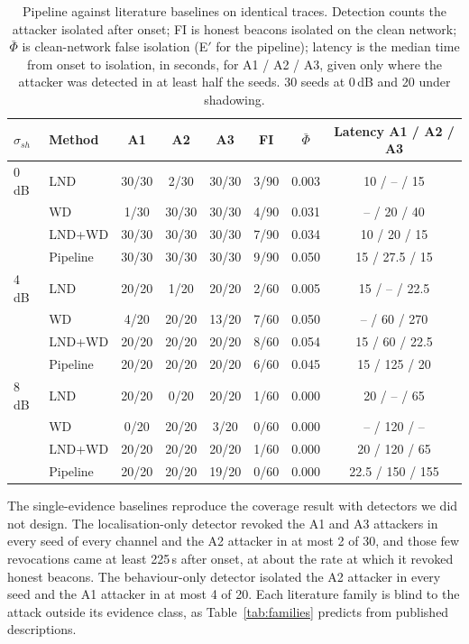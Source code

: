 \begin{table}[!t]
\caption{Pipeline against literature baselines on identical traces. Detection
counts the attacker isolated after onset; FI is honest beacons isolated on the
clean network; $\bar\Phi$ is clean-network false isolation (E$'$ for the
pipeline); latency is the median time from onset to isolation, in seconds,
for A1 / A2 / A3, given only where the attacker was detected in at least half
the seeds. 30 seeds at 0\,dB and 20 under shadowing.}
\label{tab:baselines}
\centering
\footnotesize
\setlength{\tabcolsep}{3.5pt}
\begin{tabular}{@{}llcccccc@{}}
\toprule
$\sigma_{sh}$ & Method & A1 & A2 & A3 & FI & $\bar\Phi$ & Latency A1 / A2 / A3 \\
\midrule
0\,dB & LND & 30/30 & 2/30 & 30/30 & 3/90 & 0.003 & 10 / -- / 15 \\
      & WD & 1/30 & 30/30 & 30/30 & 4/90 & 0.031 & -- / 20 / 40 \\
      & LND+WD & 30/30 & 30/30 & 30/30 & 7/90 & 0.034 & 10 / 20 / 15 \\
      & Pipeline & 30/30 & 30/30 & 30/30 & 9/90 & 0.050 & 15 / 27.5 / 15 \\
4\,dB & LND & 20/20 & 1/20 & 20/20 & 2/60 & 0.005 & 15 / -- / 22.5 \\
      & WD & 4/20 & 20/20 & 13/20 & 7/60 & 0.050 & -- / 60 / 270 \\
      & LND+WD & 20/20 & 20/20 & 20/20 & 8/60 & 0.054 & 15 / 60 / 22.5 \\
      & Pipeline & 20/20 & 20/20 & 20/20 & 6/60 & 0.045 & 15 / 125 / 20 \\
8\,dB & LND & 20/20 & 0/20 & 20/20 & 1/60 & 0.000 & 20 / -- / 65 \\
      & WD & 0/20 & 20/20 & 3/20 & 0/60 & 0.000 & -- / 120 / -- \\
      & LND+WD & 20/20 & 20/20 & 20/20 & 1/60 & 0.000 & 20 / 120 / 65 \\
      & Pipeline & 20/20 & 20/20 & 19/20 & 0/60 & 0.000 & 22.5 / 150 / 155 \\
\bottomrule
\end{tabular}
\end{table}

The single-evidence baselines reproduce the coverage result with detectors
we did not design. The localisation-only detector revoked the A1 and A3
attackers in every seed of every channel and the A2 attacker in at most 2 of
30, and those few revocations came at least 225\,s after onset, at about the
rate at which it revoked honest beacons. The behaviour-only detector isolated
the A2 attacker in every seed and the A1 attacker in at most 4 of 20. Each
literature family is blind to the attack outside its evidence class, as
Table~\ref{tab:families} predicts from published descriptions.

